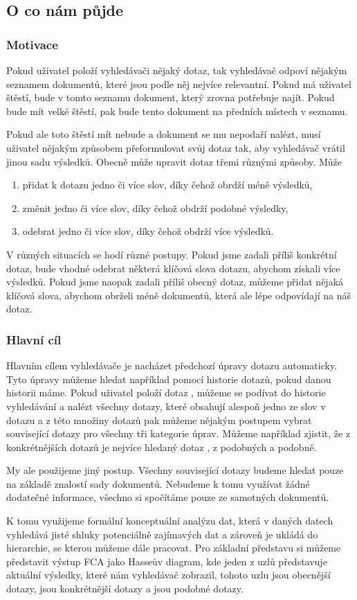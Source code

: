 \documentclass[12pt]{article}
\newcommand{\ssection}[1]{\subsection{#1}}
\newcommand{\sssection}[1]{\subsubsection{#1}}
\begin{document}
\ssection{O co nám půjde}

\sssection{Motivace}

Pokud uživatel položí vyhledávači nějaký dotaz, tak vyhledávač odpoví nějakým seznamem dokumentů, které jsou podle něj nejvíce relevantní. Pokud má uživatel štěstí, bude v tomto seznamu dokument, který zrovna potřebuje najít. Pokud bude mít velké štěstí, pak bude tento dokument na předních místech v seznamu. 

Pokud ale toto štěstí mít nebude a dokument se mu nepodaří nalézt, musí uživatel nějakým způsobem přeformulovat svůj dotaz tak, aby vyhledávač vrátil jinou sadu výsledků. Obecně může upravit dotaz třemi různými způsoby. Může

\begin{enumerate}
\item přidat k dotazu jedno či více slov, díky čehož obrdží méně výsledků,
\item změnit jedno či více slov, díky čehož obdrží podobné výsledky,
\item odebrat jedno či více slov, díky čehož obdrží více výsledků.
\end{enumerate}

V různých situacích se hodí různé postupy. Pokud jsme zadali příliš konkrétní dotaz, bude vhodné odebrat některá klíčová slova dotazu, abychom získali více výsledků. Pokud jsme naopak zadali příliš obecný dotaz, můžeme přidat nějaká klíčová slova, abychom obrželi méně dokumentů, která ale lépe odpovídají na náš dotaz. 

\sssection{Hlavní cíl}

Hlavním cílem vyhledávače je nacházet předchozí úpravy dotazu automaticky. Tyto úpravy můžeme hledat například pomocí historie dotazů, pokud danou historii máme. Pokud uživatel položí dotaz , můžeme se podívat do historie vyhledávání a nalézt všechny dotazy, které obsahují alespoň jedno ze slov v dotazu a z této množiny dotazů pak můžeme nějakým postupem vybrat související dotazy pro všechny tři kategorie úprav. Můžeme například zjistit, že z konkrétnějších dotazů je nejvíce hledaný dotaz , z podobných  a podobně. 

My ale použijeme jiný postup. Všechny související dotazy budeme hledat pouze na základě znalostí sady dokumentů. Nebudeme k tomu využívat žádné dodatečné informace, všechno si spočítáme pouze ze samotných dokumentů.

K tomu využijeme formální konceptuální analýzu dat, která v daných datech vyhledává jisté shluky potenciálně zajímavých dat a zároveň je ukládá do hierarchie, se kterou můžeme dále pracovat. Pro základní představu si můžeme představit výstup FCA jako Hasseův diagram, kde jeden z uzlů představuje aktuální výsledky, které nám vyhledávač zobrazil,  tohoto uzlu jsou obecnější dotazy,  jsou konkrétnější dotazy a  jsou podobné dotazy. 
\end{document}
